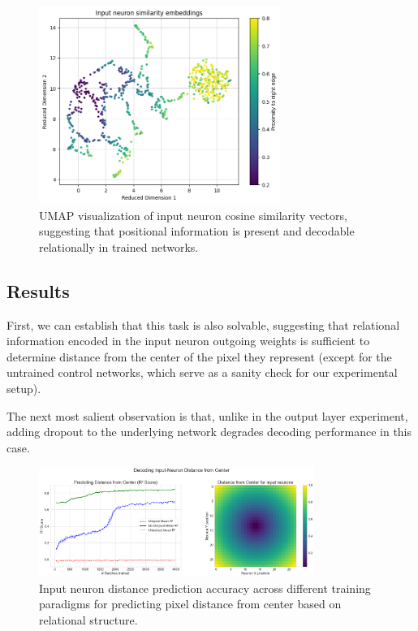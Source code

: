 \documentclass[11pt]{article}
\begin{document}
\begin{figure}[htbp]
\centering
\includegraphics[width=0.7\textwidth]{figures/umap-input-neuron-similarity.png}
\caption{UMAP visualization of input neuron cosine similarity vectors, suggesting that positional information is present and decodable relationally in trained networks.}
\label{fig:umap-input}
\end{figure}

\subsection{Results}

First, we can establish that this task is also solvable, suggesting that relational information encoded in the input neuron outgoing weights is sufficient to determine distance from the center of the pixel they represent (except for the untrained control networks, which serve as a sanity check for our experimental setup).

The next most salient observation is that, unlike in the output layer experiment, adding dropout to the underlying network degrades decoding performance in this case.

\begin{figure}[htbp]
\centering
\includegraphics[width=0.8\textwidth]{figures/input-neuron-distance-prediction-accuracy.png}
\caption{Input neuron distance prediction accuracy across different training paradigms for predicting pixel distance from center based on relational structure.}
\label{fig:input-accuracy}
\end{figure}
\end{document}

